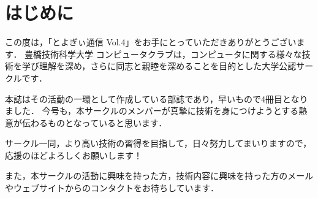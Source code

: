 \chapter{はじめに}
この度は，「とよぎぃ通信 Vol.4」をお手にとっていただきありがとうございます．
豊橋技術科学大学 コンピュータクラブは，コンピュータに関する様々な技術を学び理解を深め，さらに同志と親睦を深めることを目的とした大学公認サークルです．

本誌はその活動の一環として作成している部誌であり，早いもので4冊目となりました．
今号も，本サークルのメンバーが真摯に技術を身につけようとする熱意が伝わるものとなっていると思います．

サークル一同，より高い技術の習得を目指して，日々努力してまいりますので，応援のほどよろしくお願いします！

また，本サークルの活動に興味を持った方，技術内容に興味を持った方のメールやウェブサイトからのコンタクトをお待ちしています．
